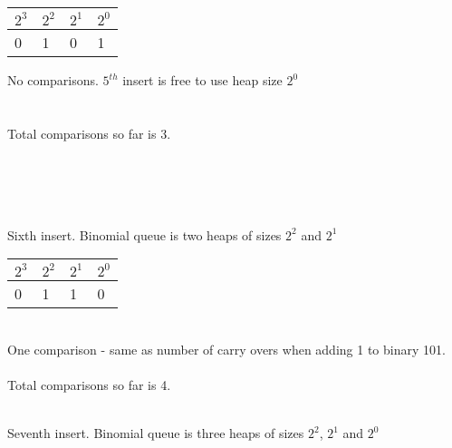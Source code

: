 \documentclass[12pt,letterpaper]{article}
\begin{document}
\begin{tabular}{ |l|l|l|l| }
   \hline
   $2^3$  & $2^2$  & $2^1$  & $2^0$ \\ \hline
    0 & 1 & 0 & 1 \\
   \hline
 \end{tabular} No comparisons. $5^{th}$ insert is free to use heap size $2^0$\\\\\\
 Total comparisons so far is 3.\\\\\\
\hspace*{.25 in}
\\\\Sixth insert. Binomial queue is two heaps of sizes $2^2$ and $2^1$\\
\begin{tabular}{ |l|l|l|l| }
   \hline
   $2^3$  & $2^2$  & $2^1$  & $2^0$ \\ \hline
    0 & 1 & 1 & 0 \\
   \hline
 \end{tabular}\\One comparison - same as number of carry overs when adding 1 to binary 101.\\\\
Total comparisons so far is 4.
\newpage
{}
\hspace*{.25 in}
\hspace*{.25 in}
\\Seventh insert. Binomial queue is three heaps of sizes $2^2$, $2^1$ and $2^0$\\
\end{document}

